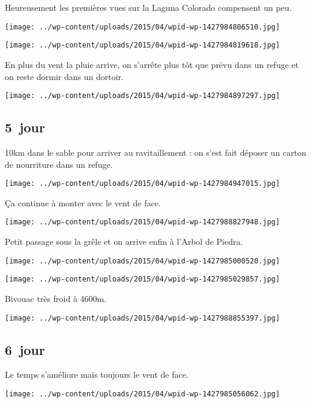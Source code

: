 \pagebreak
 Heureusement les premières vues sur la Laguna Colorado compensent un peu.
\begin{center} \texttt{[image: ../wp-content/uploads/2015/04/wpid-wp-1427984806510.jpg]} \end{center}
\begin{center} \texttt{[image: ../wp-content/uploads/2015/04/wpid-wp-1427984819618.jpg]} \end{center}

\pagebreak
 En plus du vent la pluie arrive, on s'arrête plus tôt que prévu dans un refuge et on reste dormir dans un dortoir.
\begin{center} \texttt{[image: ../wp-content/uploads/2015/04/wpid-wp-1427984897297.jpg]} \end{center}

 \subsection*{5\ieme\ jour} 

 10km dans le sable pour arriver au ravitaillement : on s'est fait déposer un carton de nourriture dans un refuge.
\begin{center} \texttt{[image: ../wp-content/uploads/2015/04/wpid-wp-1427984947015.jpg]} \end{center}

 Ça continue à monter avec le vent de face.
\begin{center} \texttt{[image: ../wp-content/uploads/2015/04/wpid-wp-1427988827948.jpg]} \end{center}

  Petit passage sous la grêle et on arrive enfin à l'Arbol de Piedra.
\begin{center} \texttt{[image: ../wp-content/uploads/2015/04/wpid-wp-1427985000520.jpg]} \end{center}
\begin{center} \texttt{[image: ../wp-content/uploads/2015/04/wpid-wp-1427985029857.jpg]} \end{center}

 Bivouac très froid à 4600m.
\begin{center} \texttt{[image: ../wp-content/uploads/2015/04/wpid-wp-1427988855397.jpg]} \end{center}

\pagebreak
 \subsection*{6\ieme\ jour} 
 Le temps s'améliore mais toujours le vent de face.
\begin{center} \texttt{[image: ../wp-content/uploads/2015/04/wpid-wp-1427985056062.jpg]} \end{center}

